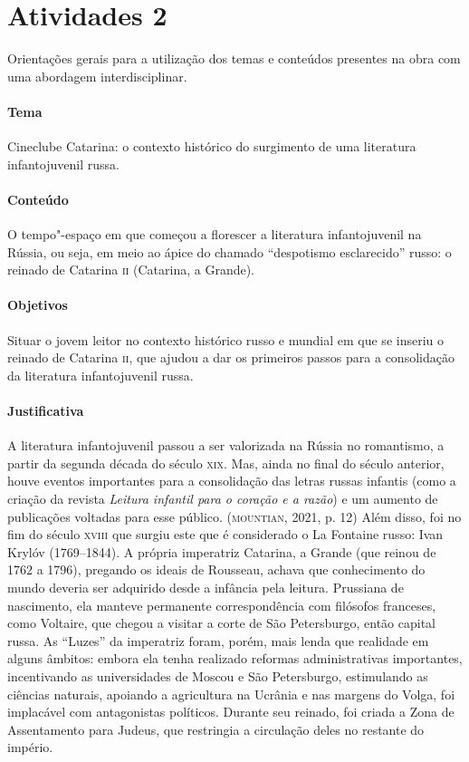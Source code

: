 \documentclass[11pt]{extarticle}
\begin{document}
\section{Atividades 2}

Orientações gerais para a utilização dos temas e conteúdos
presentes na obra com uma abordagem interdisciplinar.

\paragraph{Tema} Cineclube Catarina: o contexto histórico do
surgimento de uma literatura infantojuvenil russa.


\paragraph{Conteúdo}
O tempo"-espaço em que começou a florescer a literatura infantojuvenil na
Rússia, ou seja, em meio ao ápice do chamado ``despotismo esclarecido''
russo: o reinado de Catarina \textsc{ii} (Catarina, a Grande).

\paragraph{Objetivos}
Situar o jovem leitor no contexto histórico russo e mundial em que se
inseriu o reinado de Catarina \textsc{ii}, que ajudou a dar os primeiros passos
para a consolidação da literatura infantojuvenil russa.

\paragraph{Justificativa}
A literatura infantojuvenil passou a ser valorizada na Rússia no
romantismo, a partir da segunda década do século \textsc{xix}. Mas, ainda no
final do século anterior, houve eventos importantes para a consolidação
das letras russas infantis (como a criação da revista \emph{Leitura
infantil para o coração e a razão}) e um aumento de publicações voltadas
para esse público. (\textsc{mountian}, 2021, p. 12) Além disso, foi no fim do
século \textsc{xviii} que surgiu este que é considerado o La Fontaine russo: Ivan
Krylóv (1769--1844). A própria imperatriz Catarina, a Grande (que reinou
de 1762 a 1796), pregando os ideais de Rousseau, achava que conhecimento
do mundo deveria ser adquirido desde a infância pela leitura. Prussiana
de nascimento, ela manteve permanente correspondência com filósofos
franceses, como Voltaire, que chegou a visitar a corte de São
Petersburgo, então capital russa. As ``Luzes'' da imperatriz foram, porém,
mais lenda que realidade em alguns âmbitos: embora ela tenha realizado
reformas administrativas importantes, incentivando as universidades de
Moscou e São Petersburgo, estimulando as ciências naturais, apoiando a
agricultura na Ucrânia e nas margens do Volga, foi implacável com
antagonistas políticos. Durante seu reinado, foi criada a Zona de
Assentamento para Judeus, que restringia a circulação deles no restante
do império.
\end{document}
